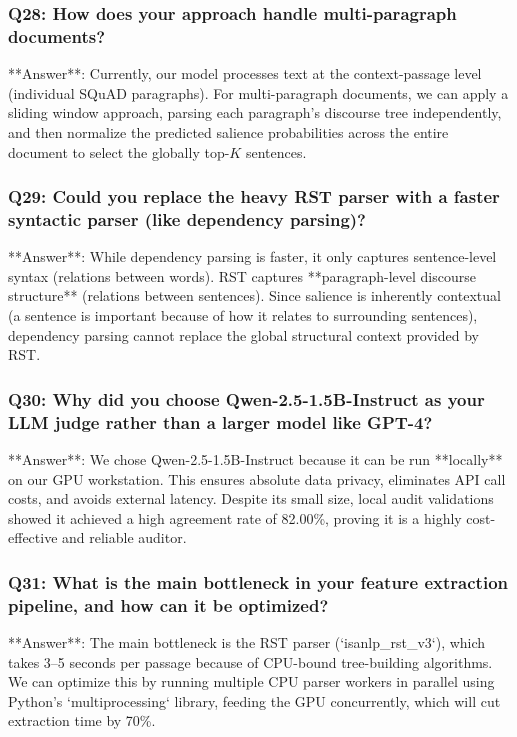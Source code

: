 \documentclass[11pt,a4paper]{article}
\begin{document}
\subsubsection{Q28: How does your approach handle multi-paragraph documents?}
**Answer**: Currently, our model processes text at the context-passage level (individual SQuAD paragraphs). For multi-paragraph documents, we can apply a sliding window approach, parsing each paragraph's discourse tree independently, and then normalize the predicted salience probabilities across the entire document to select the globally top-$K$ sentences.

\subsubsection{Q29: Could you replace the heavy RST parser with a faster syntactic parser (like dependency parsing)?}
**Answer**: While dependency parsing is faster, it only captures sentence-level syntax (relations between words). RST captures **paragraph-level discourse structure** (relations between sentences). Since salience is inherently contextual (a sentence is important because of how it relates to surrounding sentences), dependency parsing cannot replace the global structural context provided by RST.

\subsubsection{Q30: Why did you choose Qwen-2.5-1.5B-Instruct as your LLM judge rather than a larger model like GPT-4?}
**Answer**: We chose Qwen-2.5-1.5B-Instruct because it can be run **locally** on our GPU workstation. This ensures absolute data privacy, eliminates API call costs, and avoids external latency. Despite its small size, local audit validations showed it achieved a high agreement rate of 82.00\%, proving it is a highly cost-effective and reliable auditor.

\subsubsection{Q31: What is the main bottleneck in your feature extraction pipeline, and how can it be optimized?}
**Answer**: The main bottleneck is the RST parser (`isanlp\_rst\_v3`), which takes 3–5 seconds per passage because of CPU-bound tree-building algorithms. We can optimize this by running multiple CPU parser workers in parallel using Python’s `multiprocessing` library, feeding the GPU concurrently, which will cut extraction time by 70\%.
\end{document}
